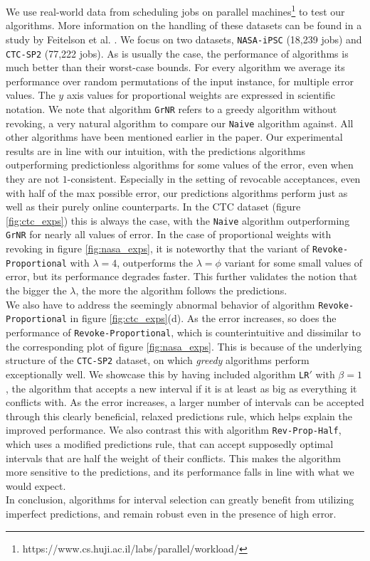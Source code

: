 

We use real-world data from scheduling jobs on parallel machines\footnote{https://www.cs.huji.ac.il/labs/parallel/workload/} to test our algorithms. More information on the handling of these datasets can be found in a study by Feitelson et al. \cite{feitelson2014experience}. We focus on two datasets, \texttt{NASA-iPSC} (18,239 jobs) and \texttt{CTC-SP2} (77,222 jobs). As is usually the case, the performance of algorithms is much better than their worst-case bounds. For every algorithm we average its performance over random permutations of the input instance, for multiple error values. The $y$ axis values for proportional weights are expressed in scientific notation. We note that algorithm \texttt{GrNR} refers to a greedy algorithm without revoking, a very natural algorithm to compare our \texttt{Naive} algorithm against. All other algorithms have been mentioned earlier in the paper. Our experimental results are in line with our intuition, with the predictions algorithms outperforming predictionless algorithms for some values of the error, even when they are not $1$-consistent. Especially in the setting of revocable acceptances, even with half of the max possible error, our predictions algorithms perform just as well as their purely online counterparts. In the CTC dataset (figure \ref{fig:ctc_exps}) this is always the case, with the \texttt{Naive} algorithm outperforming \texttt{GrNR} for nearly all values of error.
In the case of proportional weights with revoking in figure \ref{fig:nasa_exps}, it is noteworthy that the variant of \texttt{Revoke-Proportional} with $\lambda = 4$, outperforms the $\lambda = \phi$ variant for some small values of error, but its performance degrades faster. This further validates the notion that the bigger the $\lambda$, the more the algorithm follows the predictions.\\
We also have to address the seemingly abnormal behavior of algorithm \texttt{Revoke-Proportional} in figure \ref{fig:ctc_exps}(d). As the error increases, so does the performance of \texttt{Revoke-Proportional}, which is counterintuitive and dissimilar to the corresponding plot of figure \ref{fig:nasa_exps}. This is because of the underlying structure of the \texttt{CTC-SP2} dataset, on which \textit{greedy} algorithms perform exceptionally well. We showcase this by having included algorithm \texttt{LR$'$} with $\beta = 1$, the algorithm that accepts a new interval if it is at least as big as everything it conflicts with. As the error increases, a larger number of intervals can be accepted through this clearly beneficial, relaxed predictions rule, which helps explain the improved performance. We also contrast this with algorithm \texttt{Rev-Prop-Half}, which uses a modified predictions rule, that can accept supposedly optimal intervals that are half the weight of their conflicts. This makes the algorithm more sensitive to the predictions, and its performance falls in line with what we would expect.\\
In conclusion, algorithms for interval selection can greatly benefit from utilizing imperfect predictions, and remain robust even in the presence of high error.



